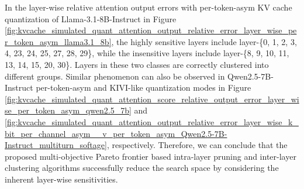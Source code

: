 In the layer-wise relative attention output errors with per-token-asym KV cache quantization of Llama-3.1-8B-Instruct in Figure \ref{fig:kvcache_simulated_quant_attention_output_relative_error_layer_wise_per_token_asym_llama3.1_8b}, the highly sensitive layers include layer-\{0, 1, 2, 3, 4, 23, 24, 25, 27, 28, 29\}, while the insensitive layers include layer-\{8, 9, 10, 11, 13, 14, 15, 20, 30\}. Layers in these two classes are correctly clustered into different groups.  Similar phenomenon can also be observed in Qwen2.5-7B-Instruct per-token-asym and KIVI-like quantization modes in Figure \ref{fig:kvcache_simulated_quant_attention_score_relative_output_error_layer_wise_per_token_asym_qwen2.5_7b} and \ref{fig:kvcache_simulated_quant_attention_output_relative_error_layer_wise_k_bit_per_channel_asym__v_per_token_asym_Qwen2.5-7B-Instruct_multiturn_softage}, respectively. Therefore, we can conclude that the proposed multi-objective Pareto frontier based intra-layer pruning and inter-layer clustering algorithms successfully reduce the search space by considering the inherent layer-wise sensitivities.

